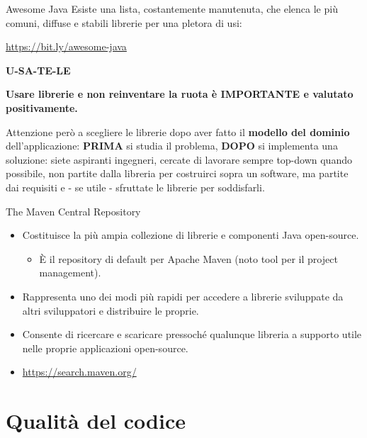 \documentclass[presentation]{beamer}
\begin{document}
\begin{frame}{Awesome Java}
	Esiste una lista, costantemente manutenuta, che elenca le più comuni, diffuse e stabili librerie per una pletora di usi:
	\begin{center}
		\url{https://bit.ly/awesome-java}
	\end{center}
	\begin{center}
		\begin{LARGE}\textbf{U-SA-TE-LE}\end{LARGE}
	\end{center}
	\begin{center}
		\textbf{Usare librerie e non reinventare la ruota è \alert{IMPORTANTE} e valutato 
positivamente.}
	\end{center}
		Attenzione però a scegliere le librerie dopo aver fatto il \textbf{modello del dominio} 
dell'applicazione: \textbf{PRIMA} si studia il problema, \textbf{DOPO} si implementa una soluzione: 
siete aspiranti ingegneri, cercate di lavorare sempre top-down quando possibile, non partite dalla 
libreria per costruirci sopra un software, ma partite dai requisiti e - se utile - sfruttate le 
librerie per soddisfarli.
\end{frame}

\begin{frame}{The Maven Central Repository}
\begin{itemize}\itemsep10pt
\item Costituisce la più ampia collezione di librerie e componenti Java open-source.
\begin{itemize}
\item È il repository di default per Apache Maven (noto tool per il project management).
\end{itemize}
\item Rappresenta uno dei modi più rapidi per accedere a librerie sviluppate da altri sviluppatori e distribuire le proprie.
\item Consente di ricercare e scaricare pressoché qualunque libreria a supporto utile nelle proprie applicazioni open-source.

\item \url{https://search.maven.org/}
\end{itemize}
\end{frame}

\section{Qualità  del codice}
\end{document}
